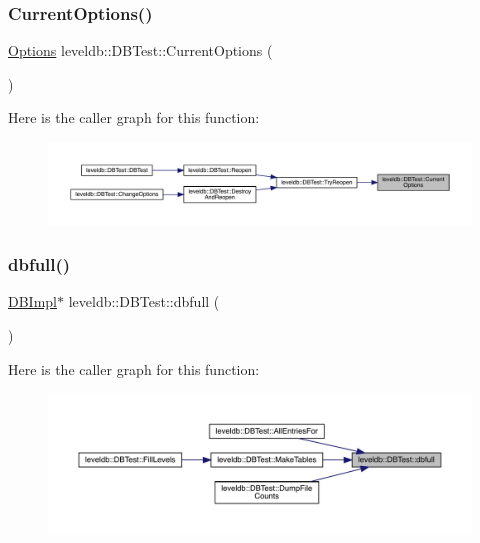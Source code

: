 \subsubsection{\texorpdfstring{CurrentOptions()}{CurrentOptions()}}
{\footnotesize\ttfamily \mbox{\hyperlink{structleveldb_1_1_options}{Options}} leveldb\+::\+D\+B\+Test\+::\+Current\+Options (\begin{DoxyParamCaption}{ }\end{DoxyParamCaption})\hspace{0.3cm}{\ttfamily [inline]}}

Here is the caller graph for this function\+:
\nopagebreak
\begin{figure}[H]
\begin{center}
\leavevmode
\includegraphics[width=350pt]{classleveldb_1_1_d_b_test_a68db410e16195a3b67822bec05c06547_icgraph}
\end{center}
\end{figure}
\mbox{\label{classleveldb_1_1_d_b_test_a67de35d247ea077c1e4fdf2a7a0f0514}} 
\subsubsection{\texorpdfstring{dbfull()}{dbfull()}}
{\footnotesize\ttfamily \mbox{\hyperlink{classleveldb_1_1_d_b_impl}{D\+B\+Impl}}$\ast$ leveldb\+::\+D\+B\+Test\+::dbfull (\begin{DoxyParamCaption}{ }\end{DoxyParamCaption})\hspace{0.3cm}{\ttfamily [inline]}}

Here is the caller graph for this function\+:
\nopagebreak
\begin{figure}[H]
\begin{center}
\leavevmode
\includegraphics[width=350pt]{classleveldb_1_1_d_b_test_a67de35d247ea077c1e4fdf2a7a0f0514_icgraph}
\end{center}
\end{figure}
\mbox{\label{classleveldb_1_1_d_b_test_a25716ec93d525adbeea8ff71e8f3a9f4}} 
